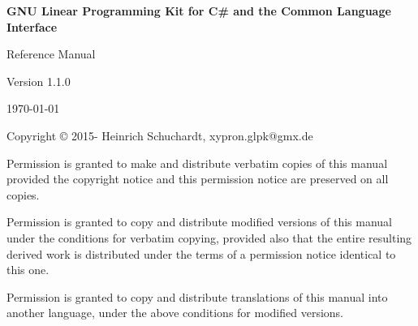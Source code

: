 \documentclass[a4paper,11pt]{report}
\newcommand{\glpkCliVersion}{1.1.0}
\begin{document}

\thispagestyle{empty}

\begin{center}

\vspace*{1in}

\begin{huge}
\sf\bfseries GNU Linear Programming Kit\linebreak
for C\# and the Common Language Interface
\end{huge}

\vspace{0.5in}

\begin{LARGE}
\sf Reference Manual
\end{LARGE}

\vspace{0.5in}

\begin{LARGE}
\sf Version \glpkCliVersion
\end{LARGE}

\vspace{0.5in}
\begin{Large}
\sf \today
\end{Large}
\end{center}

\newpage

\vspace*{1in}

\vfill

\medskip \noindent
Copyright \copyright{} 2015-{\the\year} Heinrich Schuchardt,
xypron.glpk@gmx.de

\medskip \noindent
Permission is granted to make and distribute verbatim copies of this
manual provided the copyright notice and this permission notice are
preserved on all copies.

\medskip \noindent
Permission is granted to copy and distribute modified versions of this
manual under the conditions for verbatim copying, provided also that the
entire resulting derived work is distributed under the terms of
a permission notice identical to this one.

\medskip \noindent
Permission is granted to copy and distribute translations of this manual
into another language, under the above conditions for modified versions.
\end{document}
